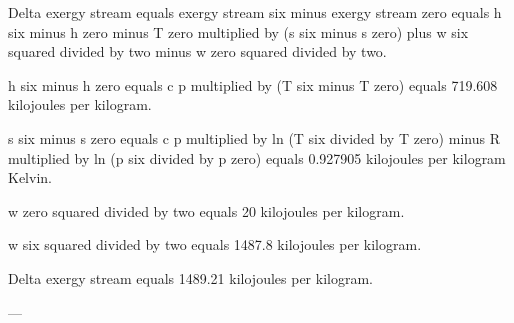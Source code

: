 Delta exergy stream equals exergy stream six minus exergy stream zero equals h six minus h zero minus T zero multiplied by (s six minus s zero) plus w six squared divided by two minus w zero squared divided by two.  

h six minus h zero equals c p multiplied by (T six minus T zero) equals 719.608 kilojoules per kilogram.  

s six minus s zero equals c p multiplied by ln (T six divided by T zero) minus R multiplied by ln (p six divided by p zero) equals 0.927905 kilojoules per kilogram Kelvin.  

w zero squared divided by two equals 20 kilojoules per kilogram.  

w six squared divided by two equals 1487.8 kilojoules per kilogram.  

Delta exergy stream equals 1489.21 kilojoules per kilogram.  

---